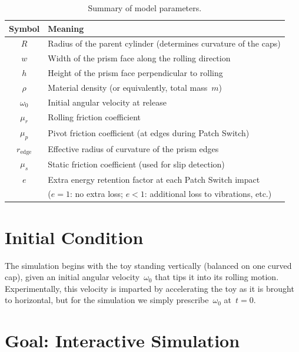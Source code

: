 \documentclass[11pt,a4paper]{article}
\begin{document}
\begin{table}[H]
\centering
\renewcommand{\arraystretch}{1.3}
\begin{tabular}{@{} c l @{}}
\toprule
\textbf{Symbol} & \textbf{Meaning} \\
\midrule
$R$        & Radius of the parent cylinder (determines curvature of the caps) \\
$w$        & Width of the prism face along the rolling direction \\
$h$        & Height of the prism face perpendicular to rolling \\
$\rho$     & Material density (or equivalently, total mass~$m$) \\
$\omega_0$ & Initial angular velocity at release \\
$\mu_r$    & Rolling friction coefficient \\
$\mu_p$    & Pivot friction coefficient (at edges during Patch Switch) \\
$r_{\mathrm{edge}}$ & Effective radius of curvature of the prism edges \\
$\mu_s$    & Static friction coefficient (used for slip detection) \\
$e$        & Extra energy retention factor at each Patch Switch impact \\
           & \quad ($e=1$: no extra loss; $e<1$: additional loss to vibrations, etc.) \\
\bottomrule
\end{tabular}
\caption{Summary of model parameters.}
\label{tab:parameters}
\end{table}

\section{Initial Condition}

The simulation begins with the toy standing vertically (balanced on one curved cap),
given an initial angular velocity~$\omega_0$ that tips it into its rolling motion.
Experimentally, this velocity is imparted by accelerating the toy as it is brought to
horizontal, but for the simulation we simply prescribe~$\omega_0$ at~$t=0$.

\section{Goal: Interactive Simulation}
\end{document}
